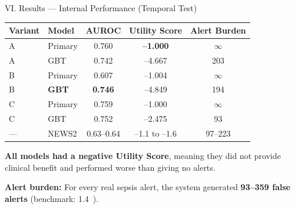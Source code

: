 \begin{frame}{VI. Results --- Internal Performance (Temporal Test)}
\begin{center}\tablestyle\footnotesize
\begin{tabular}{llccc}
\toprule
\textbf{Variant} & \textbf{Model} & \textbf{AUROC}
  & \textbf{Utility Score} & \textbf{Alert Burden} \\
\midrule
A   & Primary & 0.760 & \textbf{--1.000}  & $\infty$ \\
A   & GBT     & 0.742 & --4.667           & 203 \\
B   & Primary & 0.607 & --1.004           & $\infty$ \\
B   & \textbf{GBT} & \textbf{0.746} & --4.849 & 194 \\
C   & Primary & 0.759 & --1.000           & $\infty$ \\
C   & GBT     & 0.752 & --2.475           & 93 \\
--- & NEWS2   & 0.63--0.64 & --1.1 to --1.6 & 97--223 \\
\bottomrule
\end{tabular}
\end{center}

\vspace{4pt}
\textbf{All models had a negative Utility Score}, meaning they did not
provide clinical benefit and performed worse than giving no alerts.

\vspace{2pt}
\textbf{Alert burden:} For every real sepsis alert, the system generated
\textbf{93--359 false alerts} (benchmark: 1.4~\cite{moor2023review}).
\end{frame}


